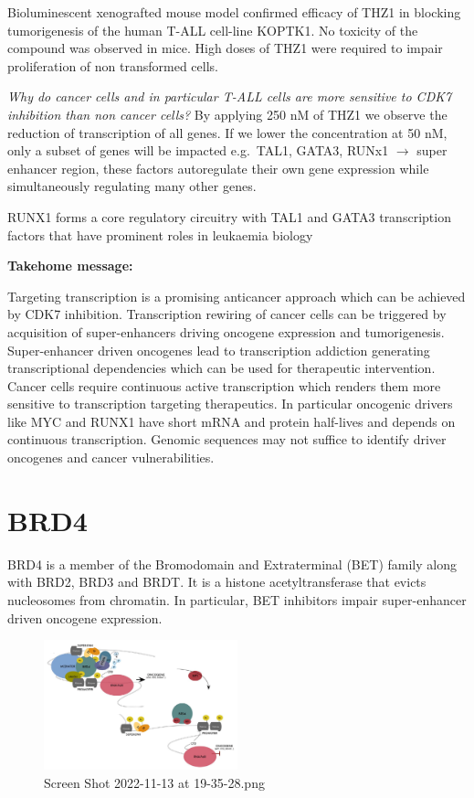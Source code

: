 Bioluminescent xenografted mouse model confirmed efficacy of THZ1 in blocking tumorigenesis of the human T-ALL cell-line KOPTK1. No toxicity of the compound was observed in mice. High doses of THZ1 were required to impair proliferation of non transformed cells.

\emph{Why do cancer cells and in particular T-ALL cells are more sensitive to CDK7 inhibition than non cancer cells?} By applying 250 nM of THZ1 we observe the reduction of transcription of all genes. If we lower the concentration at 50 nM, only a subset of genes will be impacted e.g.~TAL1, GATA3, RUNx1 $\rightarrow$ super enhancer region, these factors autoregulate their own gene expression while simultaneously regulating many other genes.

 RUNX1 forms a core regulatory circuitry with TAL1 and GATA3 transcription factors that have prominent roles in leukaemia biology

\textbf{Takehome message:}

Targeting transcription is a promising anticancer approach which can be achieved by CDK7 inhibition. Transcription rewiring of cancer cells can be triggered by acquisition of super-enhancers driving oncogene expression and tumorigenesis. Super-enhancer driven oncogenes lead to transcription addiction generating transcriptional dependencies which can be used for therapeutic intervention. Cancer cells require continuous active transcription which renders them more sensitive to transcription targeting therapeutics. In particular oncogenic drivers like MYC and RUNX1 have short mRNA and protein half-lives and depends on continuous transcription. Genomic sequences may not suffice to identify driver oncogenes and cancer vulnerabilities.

\hypertarget{brd4}{%
\section{BRD4}\label{brd4}}

BRD4 is a member of the Bromodomain and Extraterminal (BET) family along
with BRD2, BRD3 and BRDT. It is a histone acetyltransferase that evicts nucleosomes from chromatin. In particular, BET inhibitors impair super-enhancer driven oncogene expression.


\begin{figure}
\centering
\includegraphics[width=0.5\textwidth]{../_resources/Screen_Shot_2022-11-13_at_19-35-28.png}
\caption{Screen Shot 2022-11-13 at 19-35-28.png}
\end{figure}

